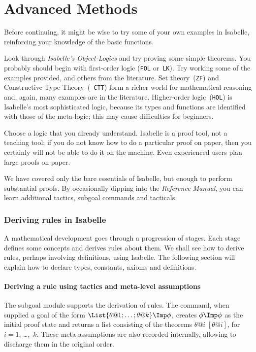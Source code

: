 \part{Advanced Methods}
Before continuing, it might be wise to try some of your own examples in
Isabelle, reinforcing your knowledge of the basic functions.

Look through {\em Isabelle's Object-Logics\/} and try proving some simple
theorems.  You probably should begin with first-order logic ({\tt FOL}
or~{\tt LK}).  Try working some of the examples provided, and others from
the literature.  Set theory~({\tt ZF}) and Constructive Type Theory~({\tt
  CTT}) form a richer world for mathematical reasoning and, again, many
examples are in the literature.  Higher-order logic~({\tt HOL}) is
Isabelle's most sophisticated logic, because its types and functions are
identified with those of the meta-logic; this may cause difficulties for
beginners.

Choose a logic that you already understand.  Isabelle is a proof
tool, not a teaching tool; if you do not know how to do a particular proof
on paper, then you certainly will not be able to do it on the machine.
Even experienced users plan large proofs on paper.

We have covered only the bare essentials of Isabelle, but enough to perform
substantial proofs.  By occasionally dipping into the {\em Reference
Manual}, you can learn additional tactics, subgoal commands and tacticals.


\section{Deriving rules in Isabelle}
A mathematical development goes through a progression of stages.  Each
stage defines some concepts and derives rules about them.  We shall see how
to derive rules, perhaps involving definitions, using Isabelle.  The
following section will explain how to declare types, constants, axioms and
definitions.


\subsection{Deriving a rule using tactics and meta-level assumptions} 
\label{deriving-example}

The subgoal module supports the derivation of rules.  The 
command, when supplied a goal of the form $\List{\theta@1; \ldots;
\theta@k} \Imp \phi$, creates $\phi\Imp\phi$ as the initial proof state and
returns a list consisting of the theorems 
${\theta@i\;[\theta@i]}$, for $i=1$, \ldots,~$k$.  These meta-assumptions are
also recorded internally, allowing  to discharge them in the
original order.

